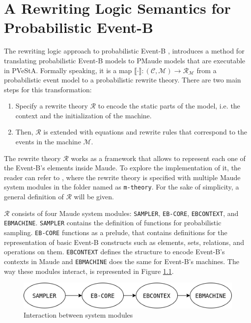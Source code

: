 \chapter{A Rewriting Logic Semantics for Probabilistic Event-B}
The rewriting logic approach to probabilistic Event-B \cite{Olarte}, introduces a method for translating probabilistic Event-B models to PMaude models that are executable in PVeStA. Formally speaking, it is a map $\llbracket \cdot \rrbracket: (\mathscr{C}, \mathscr{M}) \rightarrow \mathscr{R}_\mathscr{M}$ from a probabilistic event model to a probabilistic rewrite theory. There are two main steps for this transformation:

\begin{enumerate}
    \item Specify a rewrite theory $\mathscr{R}$ to encode the static parts of the model, i.e. the context and the initialization of the machine.
    \item Then, $\mathscr{R}$ is extended with equations and rewrite rules that correspond to the events in the machine $\mathscr{M}$.
\end{enumerate}

The rewrite theory $\mathscr{R}$ works as a framework that allows to represent each one of the Event-B's elements inside Maude. To explore the implementation of it, the reader can refer to \cite{tool.website}, where the rewrite theory is specified with multiple Maude system modules in the folder named as \texttt{m-theory}. For the sake of simplicity, a general definition of $\mathscr{R}$ will be given.

$\mathscr{R}$ consists of four Maude system modules: \texttt{SAMPLER}, \texttt{EB-CORE}, \texttt{EBCONTEXT}, and \texttt{EBMACHINE}. \texttt{SAMPLER} contains the definition of functions for probabilistic sampling. \texttt{EB-CORE} functions as a prelude, that contains definitions for the representation of basic Event-B constructs such as elements, sets, relations, and operations on them. \texttt{EBCONTEXT} defines the structure to encode Event-B's contexts in Maude and \texttt{EBMACHINE} does the same for Event-B's machines. The way these modules interact, is represented in Figure \ref{fig:E2M1}. 

\begin{figure}[h]
    \centering
    \includegraphics[scale = 0.5]{images/E2M1.png}
    \caption{Interaction between system modules}
    \label{fig:E2M1}
\end{figure}

